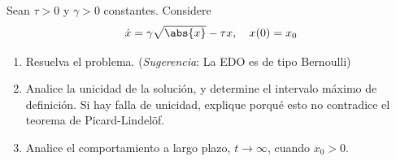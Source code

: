\documentclass{homework}
\begin{document}
\begin{prob}
    Sean \(\tau>0\) y \(\gamma>0\) constantes. Considere
    \[\dot{x}=\gamma\sqrt{\abs{x}}-\tau x,\quad x(0)=x_0\]
    \begin{enumerate}
        \item Resuelva el problema. (\textit{Sugerencia}: La EDO es de tipo Bernoulli)
        \item Analice la unicidad de la solución, y determine el intervalo máximo de definición. Si hay falla de unicidad, explique porqué esto no contradice el teorema de Picard-Lindelöf.
        \item Analice el comportamiento a largo plazo, \(t\rightarrow\infty\), cuando \(x_0>0\).
    \end{enumerate}
\end{prob}
\end{document}
